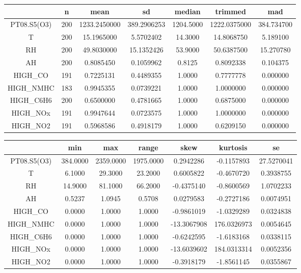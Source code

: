 \begin{table}[H]
  \centering
  \begin{tabular}{|c|c|c|c|c|c|c|}
    \hline
    & n & mean & sd & median & trimmed & mad\\
    \hline
    PT08.S5(O3) & 200 & 1233.2450000 & 389.2906253 & 1204.5000 & 1222.0375000 & 384.734700\\
    \hline
    T & 200 & 15.1965000 & 5.5702402 & 14.3000 & 14.8068750 & 5.189100\\
    \hline
    RH & 200 & 49.8030000 & 15.1352426 & 53.9000 & 50.6387500 & 15.270780\\
    \hline
    AH & 200 & 0.8085450 & 0.1059962 & 0.8125 & 0.8092338 & 0.104375\\
    \hline
    HIGH\_CO & 191 & 0.7225131 & 0.4489355 & 1.0000 & 0.7777778 & 0.000000\\
    \hline
    HIGH\_NMHC & 183 & 0.9945355 & 0.0739221 & 1.0000 & 1.0000000 & 0.000000\\
    \hline
    HIGH\_C6H6 & 200 & 0.6500000 & 0.4781665 & 1.0000 & 0.6875000 & 0.000000\\
    \hline
    HIGH\_NOx & 191 & 0.9947644 & 0.0723575 & 1.0000 & 1.0000000 & 0.000000\\
    \hline
    HIGH\_NO2 & 191 & 0.5968586 & 0.4918179 & 1.0000 & 0.6209150 & 0.000000\\
    \hline
  \end{tabular}
\end{table}

\begin{table}[H]
  \centering
  \begin{tabular}{|c|c|c|c|c|c|c|}
    \hline
    & min & max & range & skew & kurtosis & se\\
    \hline
    PT08.S5(O3) & 384.0000 & 2359.0000 & 1975.0000 & 0.2942286 & -0.1157893 & 27.5270041\\
    \hline
    T & 6.1000 & 29.3000 & 23.2000 & 0.6005822 & -0.4670720 & 0.3938755\\
    \hline
    RH & 14.9000 & 81.1000 & 66.2000 & -0.4375140 & -0.8600569 & 1.0702233\\
    \hline
    AH & 0.5237 & 1.0945 & 0.5708 & 0.0279583 & -0.2727186 & 0.0074951\\
    \hline
    HIGH\_CO  & 0.0000 & 1.0000 & 1.0000 & -0.9861019 & -1.0329289 & 0.0324838\\
    \hline
    HIGH\_NMHC & 0.0000 & 1.0000 & 1.0000 & -13.3067908 & 176.0326973 & 0.0054645\\
    \hline
    HIGH\_C6H6 & 0.0000 & 1.0000 & 1.0000 & -0.6242595 & -1.6183168 & 0.0338115\\
    \hline
    HIGH\_NOx & 0.0000 & 1.0000 & 1.0000 & -13.6039602 & 184.0313314 & 0.0052356\\
    \hline
    HIGH\_NO2 & 0.0000 & 1.0000 & 1.0000 & -0.3918179 & -1.8561145 & 0.0355867\\
    \hline
  \end{tabular}
\end{table}

